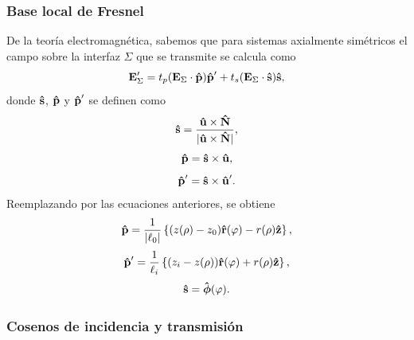 \subsubsection{Base local de Fresnel}

De la teoría electromagnética, sabemos que para sistemas axialmente simétricos el campo sobre la interfaz $\Sigma$ que se transmite se calcula como
\begin{equation}
  \vb{E}'_{\Sigma}
  =
  t_p (\vb{E}_\Sigma \cdot \bm{\hat{\mathbf{p}}}) \bm{\hat{\mathbf{p}}}'
  +
  t_s (\vb{E}_\Sigma \cdot \bm{\hat{\mathbf{s}}}) \bm{\hat{\mathbf{s}}},
  \label{eq:Transmited_E_field_in_Sigma_app}
\end{equation}
donde $\bm{\hat{\mathbf{s}}}$, $\bm{\hat{\mathbf{p}}}$ y $\bm{\hat{\mathbf{p}}}'$ se definen como
\begin{equation}
    \bm{\hat{\mathbf{s}}}
    =
    \frac{\bm{\hat{\mathbf{u}}} \times \bm{\hat{\mathbf{N}}}}{\lvert  \bm{\hat{\mathbf{u}}} \times \bm{\hat{\mathbf{N}}} \rvert},
    \label{eq:s_hat_def_app}
\end{equation}
\begin{equation}
    \bm{\hat{\mathbf{p}}}
    =
    \bm{\hat{\mathbf{s}}} \times \bm{\hat{\mathbf{u}}},
    \label{eq:p_hat_def_app}
\end{equation}
\begin{equation}
    \bm{\hat{\mathbf{p}}}'
    =
    \bm{\hat{\mathbf{s}}} \times \bm{\hat{\mathbf{u}}}'.
    \label{eq:p_prime_hat_def}
\end{equation}
Reemplazando por las ecuaciones anteriores, se obtiene
\begin{equation}
  \bm{\hat{\mathbf{p}}}
  =
  \frac{1}{|\ell_0|}
  \left\{
  (z(\rho) - z_0)\bm{\hat{\mathbf{r}}}(\varphi)
  -
  r(\rho)\bm{\hat{\mathbf{z}}}
  \right\},
  \label{eq:p_mode_ovoid}
\end{equation}
\begin{equation}
  \bm{\hat{\mathbf{p}}}'
  =
  \frac{1}{\ell_i}
  \left\{
  (z_i - z(\rho))\bm{\hat{\mathbf{r}}}(\varphi)
  +
  r(\rho)\bm{\hat{\mathbf{z}}}
  \right\},
  \label{eq:p_prime_mode_ovoid}
\end{equation}
\begin{equation}
  \bm{\hat{\mathbf{s}}}
  =
  \bm{\hat{\mathbf{\phi}}}(\varphi).
  \label{eq:s_mode_ovoid}
\end{equation}

\subsubsection{Cosenos de incidencia y transmisión}

